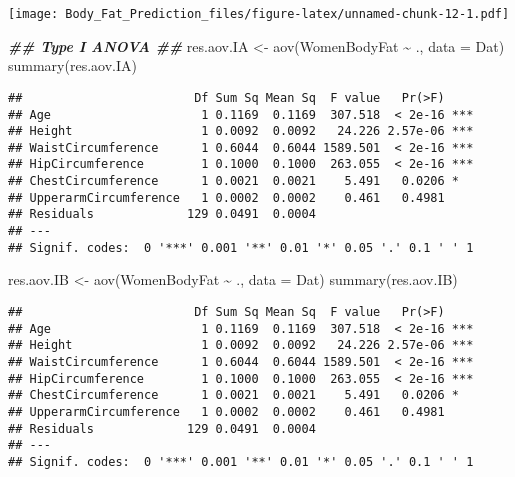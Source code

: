 \documentclass[
]{article}
\newenvironment{Shaded}{\begin{snugshade}}{\end{snugshade}}
\newcommand{\AttributeTok}[1]{\textcolor[rgb]{0.77,0.63,0.00}{#1}}
\newcommand{\DocumentationTok}[1]{\textcolor[rgb]{0.56,0.35,0.01}{\textbf{\textit{#1}}}}
\newcommand{\FunctionTok}[1]{\textcolor[rgb]{0.00,0.00,0.00}{#1}}
\newcommand{\NormalTok}[1]{#1}
\newcommand{\OtherTok}[1]{\textcolor[rgb]{0.56,0.35,0.01}{#1}}
\newcommand{\SpecialCharTok}[1]{\textcolor[rgb]{0.00,0.00,0.00}{#1}}
\begin{document}
\texttt{[image: Body\_Fat\_Prediction\_files/figure-latex/unnamed-chunk-12-1.pdf]}

\begin{Shaded}
\begin{Highlighting}[]
\DocumentationTok{\#\# Type I ANOVA \#\#}
\NormalTok{res.aov.IA }\OtherTok{\textless{}{-}} \FunctionTok{aov}\NormalTok{(WomenBodyFat }\SpecialCharTok{\textasciitilde{}}\NormalTok{ ., }\AttributeTok{data =}\NormalTok{ Dat)}
\FunctionTok{summary}\NormalTok{(res.aov.IA)}
\end{Highlighting}
\end{Shaded}

\begin{verbatim}
##                        Df Sum Sq Mean Sq  F value   Pr(>F)    
## Age                     1 0.1169  0.1169  307.518  < 2e-16 ***
## Height                  1 0.0092  0.0092   24.226 2.57e-06 ***
## WaistCircumference      1 0.6044  0.6044 1589.501  < 2e-16 ***
## HipCircumference        1 0.1000  0.1000  263.055  < 2e-16 ***
## ChestCircumference      1 0.0021  0.0021    5.491   0.0206 *  
## UpperarmCircumference   1 0.0002  0.0002    0.461   0.4981    
## Residuals             129 0.0491  0.0004                      
## ---
## Signif. codes:  0 '***' 0.001 '**' 0.01 '*' 0.05 '.' 0.1 ' ' 1
\end{verbatim}

\begin{Shaded}
\begin{Highlighting}[]
\NormalTok{res.aov.IB }\OtherTok{\textless{}{-}} \FunctionTok{aov}\NormalTok{(WomenBodyFat }\SpecialCharTok{\textasciitilde{}}\NormalTok{  ., }\AttributeTok{data =}\NormalTok{ Dat)}
\FunctionTok{summary}\NormalTok{(res.aov.IB)}
\end{Highlighting}
\end{Shaded}

\begin{verbatim}
##                        Df Sum Sq Mean Sq  F value   Pr(>F)    
## Age                     1 0.1169  0.1169  307.518  < 2e-16 ***
## Height                  1 0.0092  0.0092   24.226 2.57e-06 ***
## WaistCircumference      1 0.6044  0.6044 1589.501  < 2e-16 ***
## HipCircumference        1 0.1000  0.1000  263.055  < 2e-16 ***
## ChestCircumference      1 0.0021  0.0021    5.491   0.0206 *  
## UpperarmCircumference   1 0.0002  0.0002    0.461   0.4981    
## Residuals             129 0.0491  0.0004                      
## ---
## Signif. codes:  0 '***' 0.001 '**' 0.01 '*' 0.05 '.' 0.1 ' ' 1
\end{verbatim}
\end{document}
